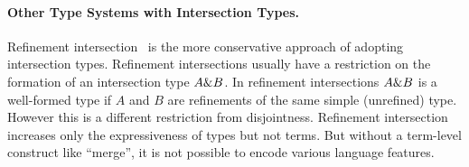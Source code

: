 \begin{comment}
only allow intersections of concrete types (classes),
whereas our language allows intersections of type variables, such as
\texttt{A \& B}. Without that vehicle, we would not be able to define
the generic \texttt{merge} function (below) for all interpretations of
a given algebra, and would incur boilerplate code:

\begin{lstlisting}
let merge [A, B] (f: ExpAlg A) (g: ExpAlg B) = {
  lit (x : Int) = f.lit x ,, g.lit x,
  add (x : A & B) (y : A & B) =
    f.add x y ,, g.add x y
}
\end{lstlisting}
\end{comment}

\paragraph{Other Type Systems with Intersection Types.}

Refinement
intersection~\cite{Dunfield07:Stardust,davies2005practical,Freeman91refinement}
is the more conservative approach of adopting intersection types. 
Refinement intersections usually have a restriction on the formation
of an intersection type $A \& B$. In refinement intersections
$A \& B$ is a well-formed type if $A$ and $B$ are
refinements of the same simple (unrefined) type. However this is a
different restriction from disjointness. Refinement intersection increases
only the expressiveness of types but not terms. But without a term-level
construct like ``merge'', it is not possible to encode various language
features. 

